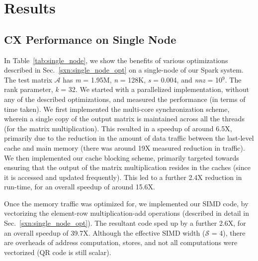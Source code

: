 \section{Results}
\label{sec:results}



\subsection{CX Performance on Single Node}
  \label{sxn:results1}


   
  \vspace*{0.1in}

      In Table~\ref{tab:single_node}, we show the benefits of various
      optimizations described in
      Sec.~\ref{sxn:single_node_opt} on a single-node of our Spark system. 
      The test matrix $\mathcal{A}$ has {\it{m}} = 1.95M, {\it{n}} = 128K,
      {\it{s}} = 0.004, and {\it{nnz}} = 10$^9$. The rank parameter,
      {\it{k}} = 32. We started with a parallelized implementation,
      without any of the described optimizations, and measured the
      performance (in terms of time taken). We first implemented the
      multi-core synchronization scheme, wherein a single copy of the
      output matrix is maintained across all the threads (for the matrix multiplication).
      This resulted in a speedup of around 6.5X, primarily due to
      the reduction in the amount of data traffic between the
      last-level cache and main memory (there was around 19X measured reduction
      in traffic). We then implemented our cache blocking scheme,
      primarily targeted towards ensuring that the output of the
      matrix multiplication resides in the caches (since it is
      accessed and updated frequently). This led to a further 2.4X
     reduction in run-time, for an overall speedup of around 15.6X.

     Once the memory traffic was optimized for, we implemented our
     SIMD code, by vectorizing the element-row multiplication-add
     operations (described in detail in Sec.~\ref{sxn:single_node_opt}). 
     The resultant code sped up by a further 2.6X, for an overall
     speedup of 39.7X. Although the effective SIMD width
 ($\mathcal{S}$ = 4), there are overheads of address computation,
 stores, and not all computations were vectorized (QR code is still
 scalar).


